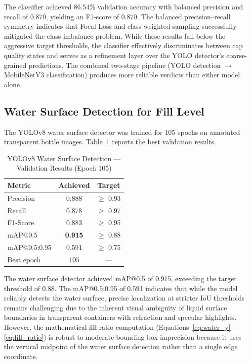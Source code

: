 \documentclass{ieeeaccess}
\begin{document}
The classifier achieved 86.54\% validation accuracy with balanced precision and recall of 0.870, yielding an F1-score of 0.870. The balanced precision--recall symmetry indicates that Focal Loss and class-weighted sampling successfully mitigated the class imbalance problem. While these results fall below the aggressive target thresholds, the classifier effectively discriminates between cap quality states and serves as a refinement layer over the YOLO detector's coarse-grained predictions. The combined two-stage pipeline (YOLO detection $\rightarrow$ MobileNetV3 classification) produces more reliable verdicts than either model alone.


\subsection{Water Surface Detection for Fill Level}

The YOLOv8 water surface detector was trained for 105 epochs on annotated transparent bottle images. Table~\ref{tab:fill_results} reports the best validation results.

\begin{table}[!t]
\caption{YOLOv8 Water Surface Detection --- Validation Results (Epoch 105)}
\label{tab:fill_results}
\centering
\small
\begin{tabular}{lcc}
\toprule
\textbf{Metric} & \textbf{Achieved} & \textbf{Target} \\
\midrule
Precision & 0.888 & $\geq$ 0.93 \\
Recall & 0.878 & $\geq$ 0.97 \\
F1-Score & 0.883 & $\geq$ 0.95 \\
mAP@0.5 & \textbf{0.915} & $\geq$ 0.88 \\
mAP@0.5:0.95 & 0.591 & $\geq$ 0.75 \\
\midrule
Best epoch & 105 & --- \\
\bottomrule
\end{tabular}
\end{table}

The water surface detector achieved mAP@0.5 of 0.915, exceeding the target threshold of 0.88. The mAP@0.5:0.95 of 0.591 indicates that while the model reliably detects the water surface, precise localization at stricter IoU thresholds remains challenging due to the inherent visual ambiguity of liquid surface boundaries in transparent containers with refraction and specular highlights. However, the mathematical fill-ratio computation (Equations~\ref{eq:water_y}--\ref{eq:fill_ratio}) is robust to moderate bounding box imprecision because it uses the vertical midpoint of the water surface detection rather than a single edge coordinate.
\end{document}
